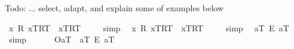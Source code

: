 \begin{isabellebody}
\isamarkuptrue%
%
\begin{isamarkuptext}%
Todo: ... select, adapt, and explain some of examples below%
\end{isamarkuptext}%
\isamarkuptrue%
\isamarkupfalse%
\ {\isachardoublequoteopen}{\isacharbrackleft}{\isacharparenleft}\isactrlbold {\isasymforall}x{\isachardot}\ \isactrlbold {\isasymexists}{\isacharparenleft}{\isasymlambda}R{\isachardot}\ {\isasymlbrace}x\isactrlsup T{\isacharcomma}R\isactrlsup T{\isasymrbrace}\ \isactrlbold {\isasymrightarrow}\ {\isasymlbrace}x\isactrlsup T{\isacharcomma}R\isactrlsup T{\isasymrbrace}{\isacharparenright}{\isacharparenright}{\isacharbrackright}\ {\isacharequal}\ {\isasymtop}{\isachardoublequoteclose}%
\isadelimproof
\ %
\endisadelimproof
%
\isatagproof
{}\isamarkupfalse%
\ simp\ \isamarkupfalse%
%
\endisatagproof
{\isafoldproof}%
%
\isadelimproof
%
\endisadelimproof
\isanewline
{}\isamarkupfalse%
\ {\isachardoublequoteopen}{\isacharbrackleft}{\isacharparenleft}\isactrlbold {\isasymexists}x{\isachardot}\ \isactrlbold {\isasymforall}{\isacharparenleft}{\isasymlambda}R{\isachardot}\ {\isasymlbrace}x\isactrlsup T{\isacharcomma}R\isactrlsup T{\isasymrbrace}\ \isactrlbold {\isasymrightarrow}\ {\isasymlbrace}x\isactrlsup T{\isacharcomma}R\isactrlsup T{\isasymrbrace}{\isacharparenright}{\isacharparenright}{\isacharbrackright}\ {\isacharequal}\ {\isasymtop}{\isachardoublequoteclose}%
\isadelimproof
\ %
\endisadelimproof
%
\isatagproof
{}\isamarkupfalse%
\ simp\ \isamarkupfalse%
%
\endisatagproof
{\isafoldproof}%
%
\isadelimproof
%
\endisadelimproof
\isanewline
\isanewline
{}\isamarkupfalse%
\ {\isachardoublequoteopen}{\isacharbrackleft}{\isacharparenleft}a\isactrlsup T{\isacharparenright}\ \isactrlbold {\isacharequal}\isactrlsub E\ {\isacharparenleft}a\isactrlsup T{\isacharparenright}{\isacharbrackright}\ {\isacharequal}\ {\isasymtop}{\isachardoublequoteclose}%
\isadelimproof
\ %
\endisadelimproof
%
\isatagproof
{}\isamarkupfalse%
\ simp%
\endisatagproof
{\isafoldproof}%
%
\isadelimproof
%
\endisadelimproof
\ \isamarkupfalse%
%
\isadelimproof
\ %
\endisadelimproof
%
\isatagproof
{}\isamarkupfalse%
\ %
%
\endisatagproof
{\isafoldproof}%
%
\isadelimproof
%
\endisadelimproof
\isanewline
\isanewline
{}\isamarkupfalse%
\ {\isachardoublequoteopen}{\isacharbrackleft}{\isasymlparr}O{\isacharbang}{\isacharcomma}a\isactrlsup T{\isasymrparr}\ \isactrlbold {\isasymrightarrow}\ {\isacharparenleft}a\isactrlsup T{\isacharparenright}\ \isactrlbold {\isacharequal}\isactrlsub E\ {\isacharparenleft}a\isactrlsup T{\isacharparenright}{\isacharbrackright}\ {\isacharequal}\ {\isasymtop}{\isachardoublequoteclose}%

\end{isabellebody}
